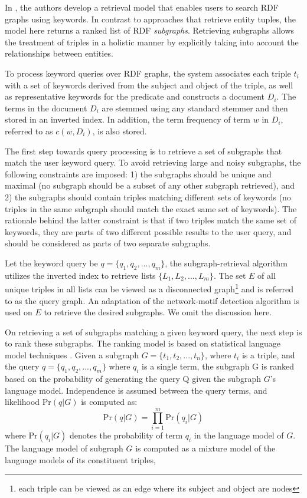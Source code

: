 \documentclass[a4paper, twoside, 12pt]{report}
\begin{document}
 In \cite{elbassuoni2011keyword}, the authors develop a retrieval model that enables users to search RDF graphs using keywords. In contrast to approaches that retrieve entity tuples, the model here returns a ranked list of RDF \emph{subgraphs}. Retrieving subgraphs allows the treatment of triples in a holistic manner by explicitly taking into account the relationships between entities.

 To process keyword queries over RDF graphs, the system associates each triple $t_i$ with a set of keywords derived from the subject and object of the triple, as well as representative keywords for the predicate and constructs a document $D_i$. The terms in the document $D_i$ are stemmed using any standard stemmer and then stored in an inverted index. In addition, the term frequency of term $w$ in $D_i$, referred to as $c(w, D_i)$, is also stored.

 The first step towards query processing is to retrieve a set of subgraphs that match the user keyword query. To avoid retrieving large and noisy subgraphs, the following constraints are imposed: 1) the subgraphs should be unique and maximal (no subgraph should be a subset of any other subgraph retrieved), and 2) the subgraphs should contain triples matching different sets of keywords (no triples in the same subgraph should match the exact same set of keywords). The rationale behind the latter constraint is that if two triples match the same set of keywords, they are parts of two different possible results to the user query, and should be considered as parts of two separate subgraphs.

 Let the keyword query be $q = \{q_1, q_2, ..., q_m\}$, the subgraph-retrieval algorithm utilizes the inverted index to retrieve lists $\{L_1, L_2, ..., L_m\}$. The set $E$ of all unique triples in all lists can be viewed as a disconnected graph\footnote{each triple can be viewed as an edge where its subject  and object are nodes} and is referred to as the query graph. An adaptation of the network-motif detection algorithm \cite{wernicke2005faster} is used on $E$ to retrieve the desired subgraphs. We omit the discussion here.

 On retrieving a set of subgraphs matching a given keyword query, the next step is to rank these subgraphs. The ranking model is based on statistical language model techniques \cite{ponte1998language}. Given a subgraph $G = \{t_1, t_2, ..., t_n\}$, where $t_i$ is a triple, and the query $q = \{q_1, q_2, ..., q_m\}$ where $q_i$ is a single term, the subgraph G  is ranked based on the probability of generating the query Q given the subgraph $G$'s language model. Independence is assumed between the query terms, and likelihood $\text{Pr}(q|G)$ is computed as:
 $$ \text{Pr}(q|G) = \prod_{i=1}^{m} \text{Pr}(q_i|G)$$
 where $\text{Pr}(q_i|G)$ denotes the probability of term $q_i$ in the language model of $G$. The language model of subgraph $G$ is computed as a mixture model of the language models of its constituent triples,
\end{document}
